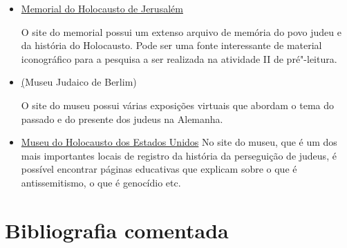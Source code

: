 \documentclass[12pt]{extarticle}
\begin{document}
\begin{itemize}
\begin{itemize}
\begin{itemize}
\item\textit{Museu do Holocausto de Curitiba}

R. Cel. Agostinho Macedo, 248 -- Curitiba - PR
\href{https://www.museudoholocausto.org.br/}{Museu do Holocausto}

Esse museu é uma das maiores referências de memória do Holocausto no Brasil.
Sugerimos que os depoimentos de sobreviventes do Holocausto presentes no site
sirvam como meio de pesquisa para a atividade II de pré"-leitura.

\item\textit{Sinagoga Zahal Kur}

R. do Bom Jesus, 197 -- Recife, PE
Foi a primeira sinagoga oficial dos judeus que habitaram as Américas. O piso térreo possui exposições permanentes sobre a cultura judaica. Pode ser interessante para conhecer a história do povo judeu no Brasil.


\end{itemize}


\subsection{Sites}

\item \href{https://www.yadvashem.org/}{Memorial do Holocausto de Jerusalém}

O site do memorial possui um extenso arquivo de memória do povo judeu
e da história do Holocausto. Pode ser uma fonte interessante de material 
iconográfico para a pesquisa a ser realizada na
atividade II de pré"-leitura.

\item \href{https://www.jmberlin.de/en}(Museu Judaico de Berlim)

O site do museu possui várias exposições virtuais que abordam o tema
do passado e do presente dos judeus na Alemanha.

\item \href{https://www.ushmm.org/}{Museu do Holocausto dos Estados Unidos}
No site do museu, que é um dos mais importantes locais de registro da história
da perseguição de judeus, é possível encontrar páginas educativas
que explicam sobre o que é antissemitismo, o que é genocídio etc.

\end{itemize}



\section{Bibliografia comentada}


\end{itemize}
\end{document}
